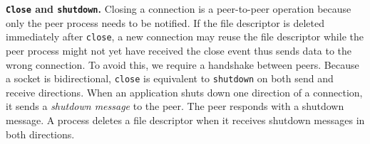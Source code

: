 
\textbf{\texttt{Close} and \texttt{shutdown}.}
Closing a connection is a peer-to-peer operation because only the peer process needs to be notified. If the file descriptor is deleted immediately after \texttt{close}, a new connection may reuse the file descriptor while the peer process might not yet have received the close event thus sends data to the wrong connection. To avoid this, we require a handshake between peers.
Because a socket is bidirectional, \texttt{close} is equivalent to \texttt{shutdown} on both send and receive directions.
When an application shuts down one direction of a connection, it sends a \textit{shutdown message} to the peer. The peer responds with a shutdown message. A process deletes a file descriptor when it receives shutdown messages in both directions.



\fi
